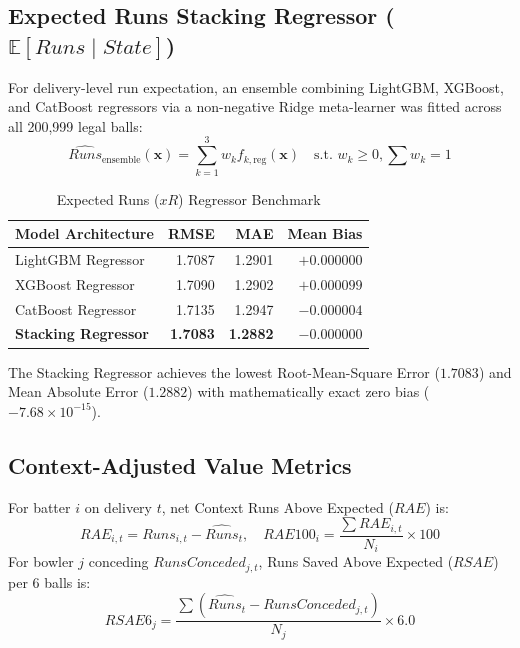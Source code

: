 \documentclass[11pt,a4paper]{article}
\begin{document}
\subsection{Expected Runs Stacking Regressor ($\mathbb{E}[Runs \mid State]$)}
For delivery-level run expectation, an ensemble combining LightGBM, XGBoost, and CatBoost regressors via a non-negative Ridge meta-learner was fitted across all 200,999 legal balls:
\begin{equation}
\widehat{Runs}_{\text{ensemble}}(\mathbf{x}) = \sum_{k=1}^3 w_k f_{k, \text{reg}}(\mathbf{x}) \quad \text{s.t. } w_k \ge 0, \sum w_k = 1
\end{equation}

\begin{table}[htbp]
\centering
\small
\caption{Expected Runs ($xR$) Regressor Benchmark}
\label{tab:ensemble_xr}
\begin{tabularx}{\linewidth}{l r r r}
\toprule
\textbf{Model Architecture} & \textbf{RMSE} & \textbf{MAE} & \textbf{Mean Bias} \\
\midrule
LightGBM Regressor & 1.7087 & 1.2901 & $+0.000000$ \\
XGBoost Regressor & 1.7090 & 1.2902 & $+0.000099$ \\
CatBoost Regressor & 1.7135 & 1.2947 & $-0.000004$ \\
\midrule
\textbf{Stacking Regressor} & \textbf{1.7083} & \textbf{1.2882} & $\mathbf{-0.000000}$ \\
\bottomrule
\end{tabularx}
\end{table}

The Stacking Regressor achieves the lowest Root-Mean-Square Error ($1.7083$) and Mean Absolute Error ($1.2882$) with mathematically exact zero bias ($-7.68 \times 10^{-15}$).

\subsection{Context-Adjusted Value Metrics}
For batter $i$ on delivery $t$, net Context Runs Above Expected ($RAE$) is:
\begin{equation}
RAE_{i, t} = Runs_{i, t} - \widehat{Runs}_t, \quad RAE100_i = \frac{\sum RAE_{i, t}}{N_i} \times 100
\end{equation}
For bowler $j$ conceding $RunsConceded_{j, t}$, Runs Saved Above Expected ($RSAE$) per 6 balls is:
\begin{equation}
RSAE6_j = \frac{\sum \left( \widehat{Runs}_t - RunsConceded_{j, t} \right)}{N_j} \times 6.0
\end{equation}
\end{document}
